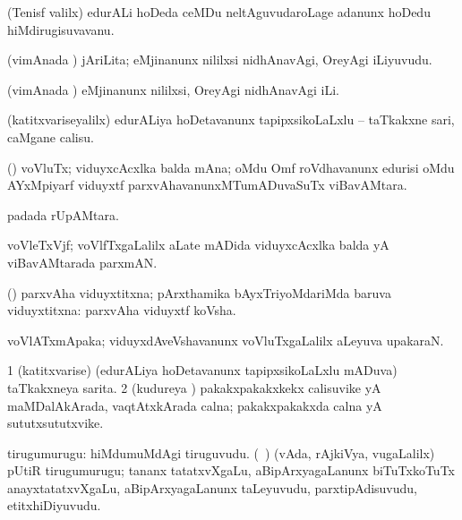 {{{{{{{{{{{{{\bentry 
{} 
\gl{\nA}
\expl{}
\bmng
 (Tenisf \mo valilx) edurALi hoDeda ceMDu neltAguvudaroLage adanunx hoDedu hiMdirugisuvavanu. 
\emng
\eentry

\bentry 
{} 
\gl{\akirx}
\expl{}
\bmng
 (vimAnada \vi) jAriLita; eMjinanunx nililxsi nidhAnavAgi, OreyAgi iLiyuvudu. 
\emng
\eentry

\bentry 
{} 
\gl{\akirx}
\expl{}
\bmng
 (vimAnada \vi) eMjinanunx nililxsi, OreyAgi nidhAnavAgi iLi. 
\emng
\eentry

\bentry
{}
\gl{\saMkiSx}
\expl{}
\bmng
\emng
\eentry

\bentry 
{} 
\gl{\akirx}
\expl{}
\bmng
 (katitxvariseyalilx) edurALiya hoDetavanunx tapipxsikoLaLxlu -- taTkakxne sari, caMgane calisu. 
\emng
\eentry

\bentry
{} 
\gl{\nA}
\expl{}
\bmng
 (\viduyx) voVluTx; viduyxcAcxlka balda mAna; oMdu Omf roVdhavanunx edurisi oMdu AYxMpiyarf viduyxtf parxvAhavanunxMTumADuvaSuTx viBavAMtara. 
\emng
\eentry

\bentry 
{} 
\gl{\nA}
\expl{}
\bmng
  padada rUpAMtara. 
\emng
\eentry

\bentry
{} 
\gl{\nA}
\expl{}
\bmng
 voVleTxVjf; voVlfTxgaLalilx aLate mADida viduyxcAcxlka balda yA viBavAMtarada parxmAN. 
\emng
\eentry

\bentry 
{} 
\gl{\gu}
\expl{}
\bmng
 (\pArxparx) parxvAha viduyxtitxna; pArxthamika bAyxTriyoMdariMda baruva viduyxtitxna:  parxvAha viduyxtf koVsha. 
\emng
\eentry

\bentry 
{} 
\gl{\nA}
\expl{}
\bmng
 voVlATxmApaka; viduyxdAveVshavanunx voVluTxgaLalilx aLeyuva upakaraN. 
\emng
\eentry

\bentry 
{} 
\gl{\nA}
\expl{}
\bmng
\bnum
\num{1} (katitxvarise) (edurALiya hoDetavanunx tapipxsikoLaLxlu mADuva) taTkakxneya sarita. 
\num{2} (kudureya \vi) pakakxpakakxkekx calisuvike yA maMDalAkArada, vaqtAtxkArada calna; pakakxpakakxda calna yA sututxsututxvike. 
\enum
\emng
\eentry

\bentry 
{} 
\gl{\nA}
\expl{}
\bmng
tirugumurugu: 
\banum
{} hiMdumuMdAgi tiruguvudu. 
 (\kanmu\ \rUpa) (vAda, rAjkiVya, \mo vugaLalilx) pUtiR tirugumurugu; tananx tatatxvXgaLu, aBipArxyagaLanunx biTuTxkoTuTx anayxtatatxvXgaLu, aBipArxyagaLanunx taLeyuvudu, parxtipAdisuvudu, etitxhiDiyuvudu. 
\eanum
\emng
\eentry

}}}}}}}}}}}}}
